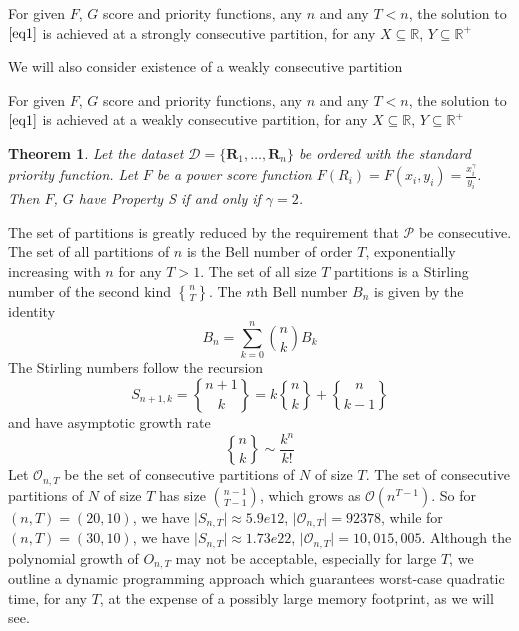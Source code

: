 \documentclass{article}
\newtheorem{thm}{Theorem}
\theoremstyle{case}
\newcommand{\stirlingii}{\genfrac{\{}{\}}{0pt}{}}
\begin{document}
\begin{addmargin}[2em]{2em} \label{propA}
\begin{list}{(Property S)}{}
\item For given $F$, $G$ score and priority functions, any $n$ and any $T < n$, the solution to $\ref{eq1}$ is achieved at a strongly consecutive partition, for any $X \subseteq \mathbb{R}$, $Y \subseteq \mathbb{R}^+$
\end{list}
\end{addmargin}
\vspace{8pt}
We will also consider existence of a weakly consecutive partition
\vspace{8pt}
\begin{addmargin}[2em]{2em} \label{propA}
\begin{list}{(Property W)}{}
\item For given $F$, $G$ score and priority functions, any $n$ and any $T < n$, the solution to $\ref{eq1}$ is achieved at a weakly consecutive partition, for any $X \subseteq \mathbb{R}$, $Y \subseteq \mathbb{R}^+$
\end{list}
\end{addmargin}
\vspace{8pt}

\begin{thm} \label{thm0}
Let the dataset $\mathcal{D} = \{ \mathbf{R}_1, \ldots, \mathbf{R}_n \}$ be ordered with the standard priority function. Let $F$ be a power score function $F(R_i) = F(x_i,y_i) = \frac{x_i^\gamma}{y_i}$. Then $F$, $G$ have Property S if and only if $\gamma = 2$.
\end{thm}

The set of partitions is greatly reduced by the requirement that $\mathcal{P}$ be consecutive. The set of all partitions of $n$ is the Bell number of order $T$, exponentially increasing with $n$ for any $T > 1$. The set of all size $T$ partitions is a Stirling number of the second kind $\stirlingii{n}{T}$. The $n$th Bell number $B_n$ is given by the identity
\[B_n = \sum_{k=0}^{n} \binom{n}{k} B_k\]
The Stirling numbers follow the recursion
\[S_{n+1,k} = \stirlingii{n+1}{k} = k\stirlingii{n}{k} + \stirlingii{n}{k-1}\]
and have asymptotic growth rate 
\[\stirlingii{n}{k} \sim \frac{k^n}{k!}\]
Let $\mathcal{O}_{n,T}$ be the set of consecutive partitions of $N$ of size $T$. The set of consecutive partitions of $N$ of size $T$ has size $\binom{n-1}{T-1}$, which grows as $\mathcal{O}\left( n^{T-1}\right)$. So for $\left(n,T\right) = \left(20, 10\right)$, we have $\vert S_{n,T}\vert \approx 5.9e12$, $\vert \mathcal{O}_{n,T}\vert = 92378$, while for $\left(n,T\right) = \left(30, 10\right)$, we have $\vert S_{n,T}\vert \approx 1.73e22$, $\vert \mathcal{O}_{n,T}\vert = 10,015,005$.  Although the polynomial growth of $O_{n,T}$ may not be acceptable, especially for large $T$, we outline a dynamic programming approach which guarantees worst-case quadratic time, for any $T$, at the expense of a possibly large memory footprint, as we will see.
\end{document}

